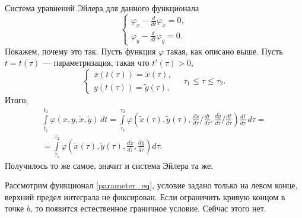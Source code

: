 \documentclass[12pt,a5paper]{book}
\begin{document}
	Система уравнений Эйлера для данного функционала
	\begin{equation*}
		\begin{cases}
			\varphi_x - \frac{d}{dt}\varphi_{\dot{x}} = 0, \\
			\varphi_y - \frac{d}{dt}\varphi_{\dot{y}} = 0.
		\end{cases}
	\end{equation*}
	Покажем, почему это так. Пусть функция $\varphi$ такая, как описано выше. Пусть $t = t(\tau)$ --- параметризация, такая что $t'(\tau) > 0$,
	\begin{equation*}
		\begin{cases}
			x(t(\tau)) = \tilde{x}(\tau), \\
			y(t(\tau)) = \tilde{y}(\tau),
		\end{cases} \quad \tau_1 \leq \tau \leq \tau_2.
	\end{equation*}
	Итого,
	\begin{equation*}
		\begin{split}
			\int\limits_{t_1}^{t_2} \varphi(x, y, \dot{x}, \dot{y})\,dt = \int\limits_{\tau_1}^{\tau_2} \varphi \left(\tilde{x}(\tau), \tilde{y}(\tau), \frac{d\tilde{x}}{d\tau}\big/\frac{dt}{d\tau}, \frac{d\tilde{y}}{d\tau}\big/\frac{dt}{d\tau}\right)\frac{dt}{d\tau}\,d\tau = \\ = \int\limits_{\tau_1}^{\tau_2} \varphi \left(\tilde{x}(\tau), \tilde{y}(\tau), \frac{d\tilde{x}}{d\tau}, \frac{d\tilde{y}}{d\tau}\right)d\tau.
		\end{split}
	\end{equation*}
	Получилось то же самое, значит и система Эйлера та же.
	
	Рассмотрим функционал \eqref{parameter_eq}, условие задано только на левом конце, верхний предел интеграла не фиксирован. Если ограничить кривую концом в точке $b$, то появится естественное граничное условие. Сейчас этого нет.
	
\end{document}
